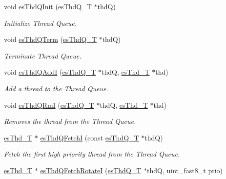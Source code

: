 \begin{DoxyCompactItemize}
void \hyperlink{group__kern__impl_gaddd5fe0557c91559b9452beb0fc236fd}{es\-Thd\-Q\-Init} (\hyperlink{group__kern__intf_ga7a1a060699e83a01512ebb5540019556}{es\-Thd\-Q\-\_\-\-T} $\ast$thd\-Q)
\begin{DoxyCompactList}\small\item\em Initialize Thread Queue. \end{DoxyCompactList}\item 
void \hyperlink{group__kern__impl_gaa5f19b32a7f0c42616b5270dcbd73a3e}{es\-Thd\-Q\-Term} (\hyperlink{group__kern__intf_ga7a1a060699e83a01512ebb5540019556}{es\-Thd\-Q\-\_\-\-T} $\ast$thd\-Q)
\begin{DoxyCompactList}\small\item\em Terminate Thread Queue. \end{DoxyCompactList}\item 
void \hyperlink{group__kern__impl_ga9da1e71c137d8adb8c9bdead7052b5fa}{es\-Thd\-Q\-Add\-I} (\hyperlink{group__kern__intf_ga7a1a060699e83a01512ebb5540019556}{es\-Thd\-Q\-\_\-\-T} $\ast$thd\-Q, \hyperlink{group__kern__intf_ga62e3a3ca0a4597a19c43cb8868810d82}{es\-Thd\-\_\-\-T} $\ast$thd)
\begin{DoxyCompactList}\small\item\em Add a thread to the Thread Queue. \end{DoxyCompactList}\item 
void \hyperlink{group__kern__impl_gaa18afa95e34035da03c5cb7ea3a96320}{es\-Thd\-Q\-Rm\-I} (\hyperlink{group__kern__intf_ga7a1a060699e83a01512ebb5540019556}{es\-Thd\-Q\-\_\-\-T} $\ast$thd\-Q, \hyperlink{group__kern__intf_ga62e3a3ca0a4597a19c43cb8868810d82}{es\-Thd\-\_\-\-T} $\ast$thd)
\begin{DoxyCompactList}\small\item\em Removes the thread from the Thread Queue. \end{DoxyCompactList}\item 
\hyperlink{group__kern__intf_ga62e3a3ca0a4597a19c43cb8868810d82}{es\-Thd\-\_\-\-T} $\ast$ \hyperlink{group__kern__impl_ga1670c123f31c346b24ec9d2b7ae35f88}{es\-Thd\-Q\-Fetch\-I} (const \hyperlink{group__kern__intf_ga7a1a060699e83a01512ebb5540019556}{es\-Thd\-Q\-\_\-\-T} $\ast$thd\-Q)
\begin{DoxyCompactList}\small\item\em Fetch the first high priority thread from the Thread Queue. \end{DoxyCompactList}\item 
\hyperlink{group__kern__intf_ga62e3a3ca0a4597a19c43cb8868810d82}{es\-Thd\-\_\-\-T} $\ast$ \hyperlink{group__kern__impl_gae365b14292f1496a90d876baec84fb4e}{es\-Thd\-Q\-Fetch\-Rotate\-I} (\hyperlink{group__kern__intf_ga7a1a060699e83a01512ebb5540019556}{es\-Thd\-Q\-\_\-\-T} $\ast$thd\-Q, uint\-\_\-fast8\-\_\-t prio)

\end{DoxyCompactItemize}
